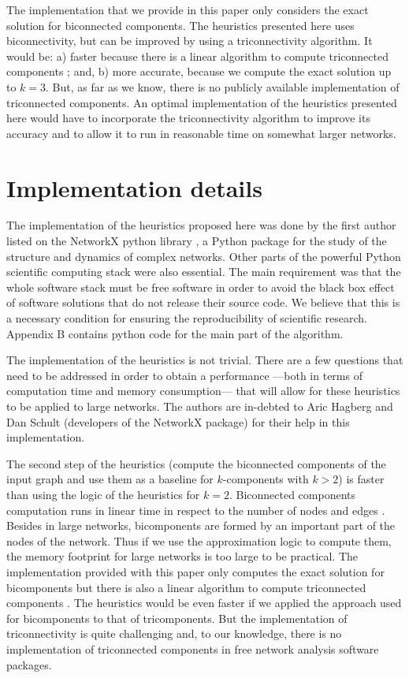 The implementation that we provide in this paper only considers the exact solution for biconnected components. The heuristics presented here uses biconnectivity, but can be improved by using a triconnectivity algorithm. It would be: a) faster because there is a linear algorithm to compute triconnected components \citep{tarjan:1974,gutwenger:2001}; and, b) more accurate, because we compute the exact solution up to $k=3$. But, as far as we know, there is no publicly available implementation of triconnected components. An optimal implementation of the heuristics presented here would have to incorporate the triconnectivity algorithm to improve its accuracy and to allow it to run in reasonable time on somewhat larger networks.

\newpage

\section{Implementation details}
\label{implementation}

The implementation of the heuristics proposed here was done by the first author listed on the NetworkX python library \citep{hagberg:2008}, a Python package for the study of the structure and dynamics of complex networks. Other parts of the powerful Python \citep{vanrossum:1995} scientific computing stack \citep{scipy,ipython, hunter:2007} were also essential. The main requirement was that the whole software stack must be free software in order to avoid the black box effect of software solutions that do not release their source code. We believe that this is a necessary condition for ensuring the reproducibility of scientific research. Appendix B contains python code for the main part of the algorithm. 

The implementation of the heuristics is not trivial. There are a few questions that need to be addressed in order to obtain a performance ---both in terms of computation time and memory consumption--- that will allow for these heuristics to be applied to large networks. The authors are in-debted to Aric Hagberg and Dan Schult (developers of the NetworkX package) for their help in this implementation.

The second step of the heuristics (compute the biconnected components of the input graph and use them as a baseline for $k$-components with $k > 2$) is faster than using the logic of the heuristics for $k=2$. Biconnected components computation runs in linear time in respect to the number of nodes and edges \citep{tarjan:1972}. Besides in large networks, bicomponents are formed by an important part of the nodes of the network. Thus if we use the approximation logic to compute them, the memory footprint for large networks is too large to be practical. The implementation provided with this paper only computes the exact solution for bicomponents but there is also a linear algorithm to compute triconnected components \citep{tarjan:1974,gutwenger:2001}. The heuristics would be even faster if we applied the approach used for bicomponents to that of tricomponents. But the implementation of triconnectivity is quite challenging and, to our knowledge, there is no implementation of triconnected components in free network analysis software packages.

